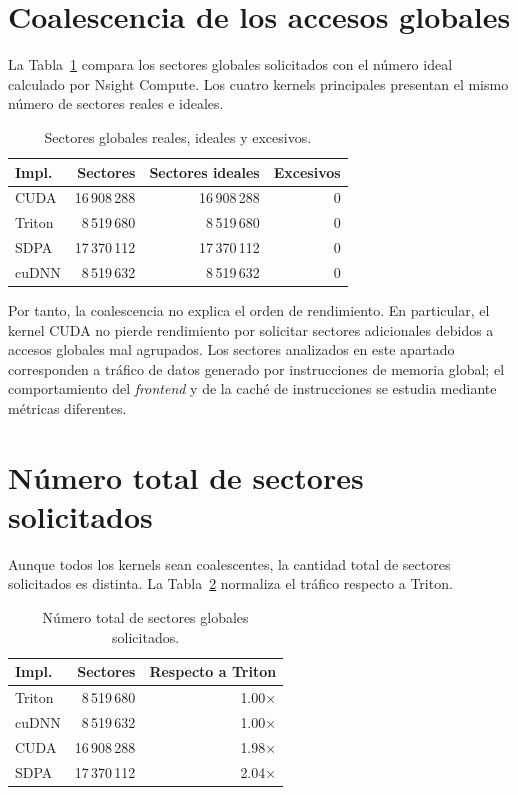 \section{Coalescencia de los accesos globales}

La Tabla~\ref{tab:coalescing} compara los sectores globales solicitados con el número ideal calculado por Nsight Compute. Los cuatro kernels principales presentan el mismo número de sectores reales e ideales.

\begin{table}[H]
\centering
\caption{Sectores globales reales, ideales y excesivos.}
\label{tab:coalescing}
\begin{tabular}{lrrr}
\toprule
\textbf{Impl.} & \textbf{Sectores} & \textbf{Sectores ideales} & \textbf{Excesivos} \\
\midrule
CUDA   & 16\,908\,288 & 16\,908\,288 & 0 \\
Triton & 8\,519\,680  & 8\,519\,680  & 0 \\
SDPA   & 17\,370\,112 & 17\,370\,112 & 0 \\
cuDNN  & 8\,519\,632  & 8\,519\,632  & 0 \\
\bottomrule
\end{tabular}
\end{table}

Por tanto, la coalescencia no explica el orden de rendimiento. En particular, el kernel CUDA no pierde rendimiento por solicitar sectores adicionales debidos a accesos globales mal agrupados. Los sectores analizados en este apartado corresponden a tráfico de datos generado por instrucciones de memoria global; el comportamiento del \textit{frontend} y de la caché de instrucciones se estudia mediante métricas diferentes.

\section{Número total de sectores solicitados}

Aunque todos los kernels sean coalescentes, la cantidad total de sectores solicitados es distinta. La Tabla~\ref{tab:global_sectors} normaliza el tráfico respecto a Triton.

\begin{table}[H]
\centering
\caption{Número total de sectores globales solicitados.}
\label{tab:global_sectors}
\begin{tabular}{lrr}
\toprule
\textbf{Impl.} & \textbf{Sectores} & \textbf{Respecto a Triton} \\
\midrule
Triton & 8\,519\,680  & 1.00$\times$ \\
cuDNN  & 8\,519\,632  & 1.00$\times$ \\
CUDA   & 16\,908\,288 & 1.98$\times$ \\
SDPA   & 17\,370\,112 & 2.04$\times$ \\
\bottomrule
\end{tabular}
\end{table}

